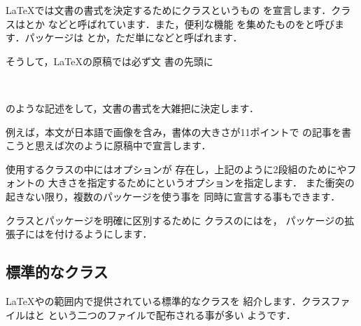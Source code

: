 {%
{\LaTeX}では文書の書式を決定するためにクラスというもの
を宣言します．クラスはとか
などと呼ばれています．また，便利な機能%
%
を集めたものをと呼びます．パッケージは
とか，ただ単になどと呼ばれます．

そうして，{\LaTeX}の原稿では必ず文
書の先頭に
\begin{Syntax}
\\ 
\end{Syntax}
のような記述をして，文書の書式を大雑把に決定します．

例えば，本文が日本語で画像を含み，書体の大きさが11ポイントで
の記事を書こうと思えば次のように原稿中で宣言します．


使用するクラスの中にはオプションが
存在し，上記のように2段組のためにやフォントの
大きさを指定するために\option{11pt}というオプションを指定します．
また衝突の起きない限り，複数のパッケージを使う事を
同時に宣言する事もできます．


クラスとパッケージを明確に区別するために
クラスのにはを，
パッケージの拡張子にはを付けるようにします．

\subsection{標準的なクラス}

%
{\LaTeX}や{\pLaTeX}の範囲内で提供されている標準的なクラスを
紹介します．クラスファイルはと
という二つのファイルで配布される事が多い
ようです．

}
